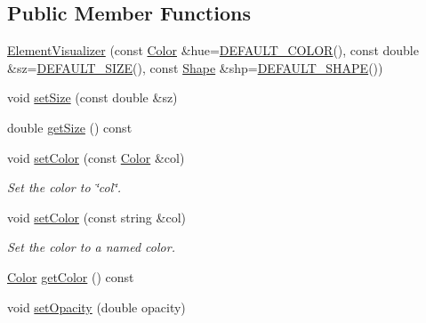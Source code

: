 \subsection*{Public Member Functions}
\begin{DoxyCompactItemize}
\item 
\hyperlink{classbridges_1_1datastructure_1_1_element_visualizer_a8104e42b94927a9b45a237064d75ca33}{Element\+Visualizer} (const \hyperlink{classbridges_1_1datastructure_1_1_color}{Color} \&hue=\hyperlink{classbridges_1_1datastructure_1_1_element_visualizer_a777a0295e8216e403108a6c90ce6790b}{D\+E\+F\+A\+U\+L\+T\+\_\+\+C\+O\+L\+OR}(), const double \&sz=\hyperlink{classbridges_1_1datastructure_1_1_element_visualizer_afa0fa3f844171f311c3d9c9025a826c5}{D\+E\+F\+A\+U\+L\+T\+\_\+\+S\+I\+ZE}(), const \hyperlink{namespacebridges_1_1datastructure_a3408f5f44d9c6062e5f3adb7e1bbb7f0}{Shape} \&shp=\hyperlink{classbridges_1_1datastructure_1_1_element_visualizer_adfba1c4d4f04ff92545d932bfce5b9d1}{D\+E\+F\+A\+U\+L\+T\+\_\+\+S\+H\+A\+PE}())
\item 
void \hyperlink{classbridges_1_1datastructure_1_1_element_visualizer_a021333b1c20dd55627ac80ae3a2138e6}{set\+Size} (const double \&sz)
\item 
double \hyperlink{classbridges_1_1datastructure_1_1_element_visualizer_a5c83b976308b254521189280bfbfbc43}{get\+Size} () const
\item 
void \hyperlink{classbridges_1_1datastructure_1_1_element_visualizer_aabf1373100f7c45b71d0caf04427644f}{set\+Color} (const \hyperlink{classbridges_1_1datastructure_1_1_color}{Color} \&col)
\begin{DoxyCompactList}\small\item\em Set the color to \char`\"{}col\char`\"{}. \end{DoxyCompactList}\item 
void \hyperlink{classbridges_1_1datastructure_1_1_element_visualizer_a0068ebe250375b13c5b3d4af0df20dea}{set\+Color} (const string \&col)
\begin{DoxyCompactList}\small\item\em Set the color to a named color. \end{DoxyCompactList}\item 
\hyperlink{classbridges_1_1datastructure_1_1_color}{Color} \hyperlink{classbridges_1_1datastructure_1_1_element_visualizer_a611005282caa27575cf3ee7e3b1540c4}{get\+Color} () const
\item 
void \hyperlink{classbridges_1_1datastructure_1_1_element_visualizer_a03f0ba203affb77d4ba8d2f1a6b1eea0}{set\+Opacity} (double opacity)

\end{DoxyCompactItemize}
